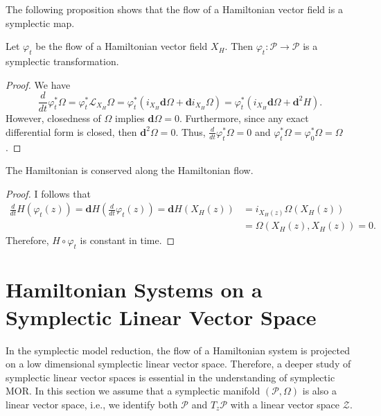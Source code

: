 The following proposition shows that the flow of a Hamiltonian vector field is a symplectic map.
\begin{proposition} \label{theorem:2.9}
Let $\varphi_t$ be the flow of a Hamiltonian vector field $X_H$. Then $\varphi_t:\mathcal P \to \mathcal P$ is a symplectic transformation.
\end{proposition}
\begin{proof}
We have
\begin{equation*}
	\frac{d}{dt} \varphi_t^* \Omega = \varphi_t^* \mathcal L_{X_H} \Omega = \varphi_t^*( i_{X_H} \mathbf d \Omega + \mathbf d i_{X_H} \Omega ) =  \varphi_t^*( i_{X_H} \mathbf d \Omega + \mathbf d^2 H ).
\end{equation*}
However, closedness of $\Omega$ implies $\mathbf d \Omega = 0$. Furthermore, since any exact differential form is closed, then $\mathbf d^2 \Omega = 0$. Thus, $\frac{d}{dt} \varphi_t^* \Omega = 0$ and $\varphi_t^* \Omega = \varphi_0^* \Omega = \Omega$.
\end{proof}
\begin{corollary} \label{theorem:2.10}
The Hamiltonian is conserved along the Hamiltonian flow.
\end{corollary}
\begin{proof}
I follows that
\begin{equation*}
\begin{aligned}
	\frac{d}{dt} H(\varphi_t(z)) = \mathbf dH\left( \frac{d}{dt} \varphi_t(z) \right) = \mathbf dH \left( X_H(z) \right) &= i_{X_H(z)} \Omega(X_H(z))\\
	& = \Omega(X_H(z),X_H(z)) = 0.
\end{aligned}
\end{equation*}
Therefore, $H\circ \varphi_t$ is constant in time.
\end{proof}

\section{Hamiltonian Systems on a Symplectic Linear Vector Space} \label{section:2.4}
In the symplectic model reduction, the flow of a Hamiltonian system is projected on a low dimensional symplectic linear vector space. Therefore, a deeper study of symplectic linear vector spaces is essential in the understanding of symplectic MOR. In this section we assume that a symplectic manifold $(\mathcal P, \Omega)$ is also a linear vector space, i.e., we identify both $\mathcal P$ and $T_z \mathcal P$ with a linear vector space $\mathcal Z$.

